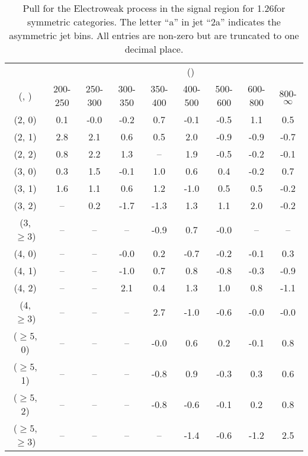 \begin{table}[h!]
\tiny
\centering
\caption{Pull for the Electroweak process in the signal region for 1.26\ifb for symmetric categories. The letter ``a'' in jet \eg ``2a''  indicates the asymmetric jet bins. All entries are non-zero but are truncated to one decimal place.\label{tab:pullsep_ewk_sig_sym}}
\begin{tabular}
{ccccccccc}
	\hline\hline
&	& \multicolumn{8}{c}{\scalht (\gev)} \\ 
	 (\njet,  \nb) & 200-250 & 250-300 & 300-350 & 350-400 & 400-500 & 500-600 & 600-800 & 800-$\infty$ \\ [0.8ex] 
\hline
	(2, 0) & 0.1 & -0.0 & -0.2 & 0.7 & -0.1 & -0.5 & 1.1 & 0.5 \\[0.5ex] 
	(2, 1) & 2.8 & 2.1 & 0.6 & 0.5 & 2.0 & -0.9 & -0.9 & -0.7 \\[0.5ex] 
	(2, 2) & 0.8 & 2.2 & 1.3 & -- & 1.9 & -0.5 & -0.2 & -0.1 \\[0.5ex] 
	(3, 0) & 0.3 & 1.5 & -0.1 & 1.0 & 0.6 & 0.4 & -0.2 & 0.7 \\[0.5ex] 
	(3, 1) & 1.6 & 1.1 & 0.6 & 1.2 & -1.0 & 0.5 & 0.5 & -0.2 \\[0.5ex] 
	(3, 2) & -- & 0.2 & -1.7 & -1.3 & 1.3 & 1.1 & 2.0 & -0.2 \\[0.5ex] 
	(3, $\ge3$) & -- & -- & -- & -0.9 & 0.7 & -0.0 & -- & -- \\[0.5ex] 
	(4, 0) & -- & -- & -0.0 & 0.2 & -0.7 & -0.2 & -0.1 & 0.3 \\[0.5ex] 
	(4, 1) & -- & -- & -1.0 & 0.7 & 0.8 & -0.8 & -0.3 & -0.9 \\[0.5ex] 
	(4, 2) & -- & -- & 2.1 & 0.4 & 1.3 & 1.0 & 0.8 & -1.1 \\[0.5ex] 
	(4, $\ge3$) & -- & -- & -- & 2.7 & -1.0 & -0.6 & -0.0 & -0.0 \\[0.5ex] 
	($\ge5$, 0) & -- & -- & -- & -0.0 & 0.6 & 0.2 & -0.1 & 0.8 \\[0.5ex] 
	($\ge5$, 1) & -- & -- & -- & -0.8 & 0.9 & -0.3 & 0.3 & 0.6 \\[0.5ex] 
	($\ge5$, 2) & -- & -- & -- & -0.8 & -0.6 & -0.1 & 0.2 & 0.8 \\[0.5ex] 
	($\ge5$, $\ge3$) & -- & -- & -- & -- & -1.4 & -0.6 & -1.2 & 2.5 \\[0.5ex] 
	\hline
	\hline
\end{tabular}
\end{table}
